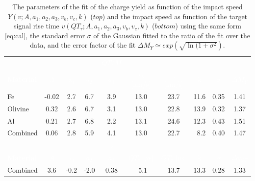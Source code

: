 \begin{table}[h!]
    \centering
               \renewcommand{\arraystretch}{1}
    \begin{tabular}{|lccccccccc|}


 \rowcolor{darkGrey}    \textcolor{white}{\textbf{}} & \textcolor{white}{\textbf{}} & \textcolor{white}{\textbf{}} &\textcolor{white}{\textbf{}} & \textcolor{white}{\textbf{$QT/M$}} &\textcolor{white}{\textbf{}} & \textcolor{white}{\textbf{}} & \textcolor{white}{\textbf{}} & \textcolor{white}{\textbf{}}&\textcolor{white}{\textbf{}} \\
 \rowcolor{darkGrey}    \textcolor{white}{\textbf{Material}} & \textcolor{white}{{$A$}} & \textcolor{white}{{$a_1$}} &\textcolor{white}{{ $a_2$}} & \textcolor{white}{{$a_3$}} &\textcolor{white}{{$v_b$  [km/s]}} & \textcolor{white}{{$v_c$} [km/s]} & \textcolor{white}{{k}} & \textcolor{white}{{$\sigma$}}&\textcolor{white}{\textbf{$\Delta M_Y$}} \\
        Fe & -0.02 & 2.7 & 6.7 & 3.9 & 13.0 & 23.7 & 11.6& 0.35 & 1.41 \\
   Olivine & 0.32 & 2.6 & 6.7 & 3.1 & 13.0 & 22.8 & 13.9 &0.32 & 1.37 \\
   Al      &0.21  & 2.7 & 6.8 & 2.2 & 13.1 & 24.6 & 12.3 &0.43 & 1.51 \\
Combined   & 0.06 & 2.8  & 5.9 & 4.1 & 13.0 & 22.7  & \ 8.2& 0.40 &1.47\\
     \hline
 \rowcolor{darkGrey}    \textcolor{white}{\textbf{}} & \textcolor{white}{\textbf{}} & \textcolor{white}{\textbf{}} & \textcolor{white}{\textbf{}} & \textcolor{white}{\textbf{{$v$}}} & 
 \textcolor{white}{\textbf{}} & \textcolor{white}{\textbf{}}  & \textcolor{white}{\textbf{}} & \textcolor{white}{\textbf{}}& \textcolor{white}{\textbf{}} \\
  \rowcolor{darkGrey}    \textcolor{white}{\textbf{Material}} & \textcolor{white}{{$A$}} & \textcolor{white}{{$a_1$}} &\textcolor{white}{{ $a_2$}} & \textcolor{white}{{$a_3$}} &\textcolor{white}{{$QT_{\tau}^b$  [$\mu$s]}} & \textcolor{white}{{$QT_{\tau}^c$} [$\mu$s]} & \textcolor{white}{{k}} & \textcolor{white}{\textbf{$\sigma$}}&\textcolor{white}{\textbf{$\Delta v_{QT}$}} \\
 Combined   & 3.6 & -0.2  & -2.0 & 0.38 &\  5.1 & 13.7  & 13.3 & 0.28 & 1.33 \\
     \hline
    \end{tabular}
    \caption{The parameters of the fit of the charge yield as function of the impact speed $Y(v; A, a_1, a_2, a_3, v_b, v_c, k)$ ($top$) and the impact speed as function of the target signal rise time $v(QT_{\tau}; A, a_1, a_2, a_3, v_b, v_c, k)$  ($bottom$) using the same form \autoref{eq:cal}, the standard error $\sigma$ of the Gaussian fitted to the ratio of the fit over the data, and the error factor of the fit  $\Delta M_Y
    \simeq exp(\sqrt{\ln(1 + \sigma^2})$.
    }
\label{tab:params}
\end{table}

